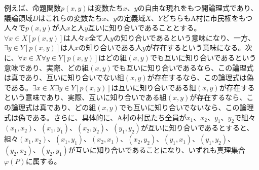\documentclass[a4paper]{jsarticle}
\begin{document}
例えば、命題関数$p(x,y)$は変数たち$x$、$y$の自由な現れをもつ開論理式であり、議論領域$D$はこれらの変数たち$x$、$y$の定義域$X$、$Y$どちらもA村に市民権をもつ人々で$p(x,y)$が人$x$と人$y$互いに知り合いであることとする。$\forall x \in X\left[ p(x,y) \right]$は人々$x$全て人$y$の知り合いであるという意味になり、一方、$\exists y \in Y\left[ p(x,y) \right]$は人$x$の知り合いである人$y$が存在するという意味になる。次に、$\forall x \in X\forall y \in Y\left[ p(x,y) \right]$はどの組$(x,y)$でも互いに知り合いであるという意味であり、実際、どの組$(x,y)$でも互いに知り合いであるなら、この論理式は真であり、互いに知り合いでない組$(x,y)$が存在するなら、この論理式は偽である。$\exists x \in X\exists y \in Y\left[ p(x,y) \right]$は互いに知り合いである組$(x,y)$が存在するという意味であり、実際、互いに知り合いである組$(x,y)$が存在するなら、この論理式は真であり、どの組$(x,y)$でも互いに知り合いでないなら、この論理式は偽である。さらに、具体的に、A村の村民たち全員が$x_{1}$、$x_{2}$、$y_{1}$、$y_{2}$で組々$\left( x_{1},x_{2} \right)$、$\left( x_{1},y_{1} \right)$、$\left( x_{2},y_{2} \right)$、$\left( y_{1},y_{2} \right)$が互いに知り合いであるとすると、組々$\left( x_{1},x_{2} \right)$、$\left( x_{1},y_{1} \right)$、$\left( x_{2},x_{1} \right)$、$\left( x_{2},y_{2} \right)$、$\left( y_{1},x_{1} \right)$、$\left( y_{1},y_{2} \right)$、$\left( y_{2},x_{2} \right)$、$\left( y_{2},y_{1} \right)$が互いに知り合いであることになり、いずれも真理集合$\varphi(P)$に属する。
\end{document}
